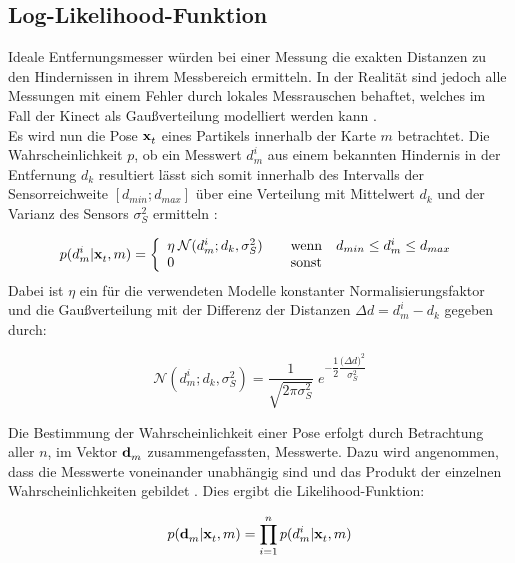 
\subsection{Log-Likelihood-Funktion}
\label{chap.loglik}
Ideale Entfernungsmesser würden bei einer Messung die exakten Distanzen zu den Hindernissen in ihrem Messbereich ermitteln. In der Realität sind jedoch alle Messungen mit einem Fehler durch lokales Messrauschen behaftet, welches im Fall der Kinect als Gaußverteilung modelliert werden kann \cite{Nguyen2012}.\\

Es wird nun die Pose $\mathbf{x}^{}_{t}$ eines Partikels innerhalb der Karte $m$ betrachtet. Die Wahrscheinlichkeit $p$, ob ein Messwert $d_m^i$ aus einem bekannten Hindernis in der Entfernung $d_k$ resultiert lässt sich somit innerhalb des Intervalls der Sensorreichweite $[d_{min};d_{max}]$ über eine Verteilung mit Mittelwert $d_k$ und der Varianz des Sensors $\sigma_{S}^2$ ermitteln \cite{Thrun2005}:

\begin{equation}
p(d_m^i|\mathbf{x}^{}_{t},m) = \left\lbrace\begin{array}{ll}
\eta \: \mathcal{N}(d_m^i;d_k,\sigma_S^2) & \quad \mathrm{wenn} \quad d_{min}\leq d_m^i \leq d_{max} \\
0 & \quad \mathrm{sonst}
\end{array}
\right.
\end{equation}
Dabei ist $\eta$ ein für die verwendeten Modelle konstanter Normalisierungsfaktor und die Gaußverteilung mit der Differenz der Distanzen $\Delta d = d_m^i-d_k$  gegeben durch:

\begin{equation}
\mathcal{N}(d_m^i;d_k,\sigma_S^2) = \frac{1}{\sqrt{2\pi\sigma_S^2}} \; e^{-\dfrac{1}{2}\dfrac{{(\Delta d})^2}{\sigma_S^2}}
\end{equation}

Die Bestimmung der Wahrscheinlichkeit einer Pose erfolgt durch Betrachtung aller $n$, im Vektor $\mathbf{d}^{}_{m}$ zusammengefassten, Messwerte. Dazu wird angenommen, dass die Messwerte voneinander unabhängig sind und das Produkt der einzelnen Wahrscheinlichkeiten gebildet \cite{Hornung2010}. Dies ergibt die Likelihood-Funktion:

\begin{equation}
\label{eq.likelihood}
p(\mathbf{d}^{}_{m}|\mathbf{x}^{}_{t},m) = \prod_{i=1}^{n}p(d_m^i|\mathbf{x}^{}_{t},m)
\end{equation}

